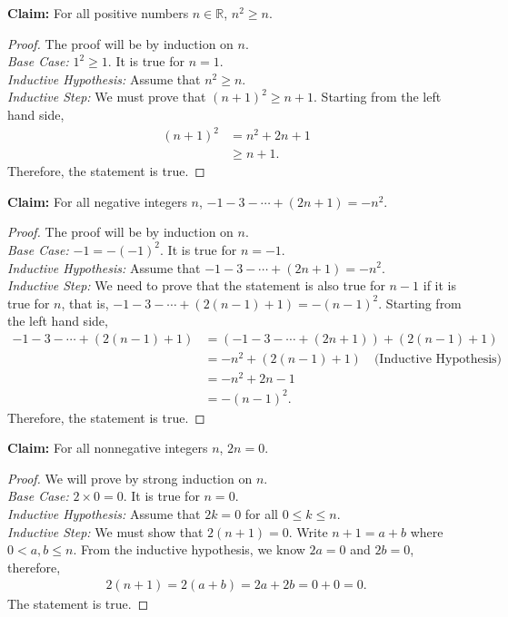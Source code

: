 \begin{Parts}
	\Part
		\textbf{Claim:} For all positive numbers $n \in \mathbb{R}$, $n^2 \ge n$.
		\begin{proof}
			The proof will be by induction on $n$.	\\
			\emph{Base Case:} $1^2 \ge 1$. It is true for $n=1$.	\\
			\emph{Inductive Hypothesis:} Assume that $n^2 \ge n$. 	\\
			\emph{Inductive Step:} We must prove that $(n+1)^2 \ge n+1$.
			Starting from the left hand side,
			\begin{align*}
				(n+1)^2 &= n^2+2n+1 \\
						&\ge n+1.
			\end{align*}
			Therefore, the statement is true.
		\end{proof}

	\Part
		\textbf{Claim:} For all negative integers $n$, $-1-3-\cdots+(2n+1) = -n^2$.
		\begin{proof}
			The proof will be by induction on $n$.	\\
			\emph{Base Case:} $-1 = -(-1)^2$. It is true for $n=-1$. \\
			\emph{Inductive Hypothesis:} Assume that $-1-3-\cdots+(2n+1) = -n^2$. \\
			\emph{Inductive Step:} We need to prove that the statement is also true for $n-1$ if it is true for $n$, that is,
			 $-1-3-\cdots+(2(n-1)+1) = -(n-1)^2$. Starting from the left hand side,
			\begin{align*}
				-1-3-\cdots+(2(n-1)+1)
				&= (-1-3-\cdots + (2n+1))+(2(n-1)+1)	\\
				&= -n^2 + (2(n-1)+1)				\quad \text{(Inductive Hypothesis)}\\
				&= -n^2 + 2n - 1					\\
				&= -(n-1)^2.
			\end{align*}
			Therefore, the statement is true.
		\end{proof}

	\Part
		\textbf{Claim:} For all nonnegative integers $n$, $2n=0$.
		\begin{proof}
			We will prove by strong induction on $n$.	\\
			\emph{Base Case:} $2 \times 0 = 0$. It is true for $n=0$.	\\
			\emph{Inductive Hypothesis:} Assume that $2k=0$ for all $0 \le k \le n$.	\\
			\emph{Inductive Step:} We must show that $2(n+1)=0$. Write $n+1 = a+b$ where $0 < a,b \le n$.
			From the inductive hypothesis, we know $2a = 0$ and $2b=0$, therefore,
			\begin{align*}
				2(n+1) = 2(a+b) = 2a + 2b = 0+0 =0.
			\end{align*}
			The statement is true.
		\end{proof}

\end{Parts}



